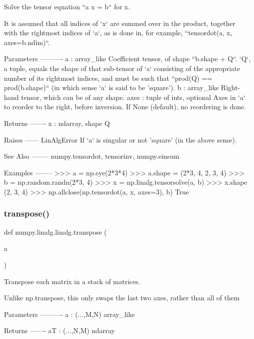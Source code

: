 \begin{DoxyVerb}Solve the tensor equation ``a x = b`` for x.

It is assumed that all indices of `x` are summed over in the product,
together with the rightmost indices of `a`, as is done in, for example,
``tensordot(a, x, axes=b.ndim)``.

Parameters
----------
a : array_like
    Coefficient tensor, of shape ``b.shape + Q``. `Q`, a tuple, equals
    the shape of that sub-tensor of `a` consisting of the appropriate
    number of its rightmost indices, and must be such that
    ``prod(Q) == prod(b.shape)`` (in which sense `a` is said to be
    'square').
b : array_like
    Right-hand tensor, which can be of any shape.
axes : tuple of ints, optional
    Axes in `a` to reorder to the right, before inversion.
    If None (default), no reordering is done.

Returns
-------
x : ndarray, shape Q

Raises
------
LinAlgError
    If `a` is singular or not 'square' (in the above sense).

See Also
--------
numpy.tensordot, tensorinv, numpy.einsum

Examples
--------
>>> a = np.eye(2*3*4)
>>> a.shape = (2*3, 4, 2, 3, 4)
>>> b = np.random.randn(2*3, 4)
>>> x = np.linalg.tensorsolve(a, b)
>>> x.shape
(2, 3, 4)
>>> np.allclose(np.tensordot(a, x, axes=3), b)
True\end{DoxyVerb}
 \mbox{\label{namespacenumpy_1_1linalg_1_1linalg_aa09bcb87c1535e18aab6f3601255277c}} 
\subsubsection{\texorpdfstring{transpose()}{transpose()}}
{\footnotesize\ttfamily def numpy.\+linalg.\+linalg.\+transpose (\begin{DoxyParamCaption}\item[{}]{a }\end{DoxyParamCaption})}

\begin{DoxyVerb}Transpose each matrix in a stack of matrices.

Unlike np.transpose, this only swaps the last two axes, rather than all of
them

Parameters
----------
a : (...,M,N) array_like

Returns
-------
aT : (...,N,M) ndarray
\end{DoxyVerb}
 

